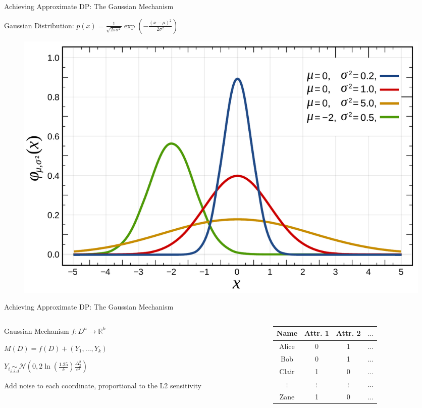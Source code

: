 \documentclass[12pt,aspectratio=169]{beamer}
\begin{document}
\begin{frame}{Achieving Approximate DP: The Gaussian Mechanism}

Gaussian Distribution: $p(x) = \frac{1}{\sqrt{2\pi \sigma^2}}\exp (-\frac{(x - \mu)^2}{2\sigma^2})$

\begin{figure}
    \centering
    \includegraphics[width=0.7\linewidth]{figures/Normal_Distribution_PDF.pdf}
\end{figure}

\end{frame}

\begin{frame}{Achieving Approximate DP: The Gaussian Mechanism}

\begin{columns}[c]

\begin{column}{.5\textwidth}

\begin{block}{Gaussian Mechanism}
$f: D^n \rightarrow \mathbb{R}^k$

$M(D) = f(D) + (Y_1, \dots, Y_k)$

$Y_i \underset{i.i.d}{\sim} \mathcal{N}(0, 2\ln(\frac{1.25}{\delta})\frac{\Delta_2^2}{\varepsilon^2} )$
\end{block}

Add noise to each coordinate, proportional to the L2 sensitivity

\end{column}

\begin{column}{.5\textwidth}

\begin{table}[t]
    \centering
    \begin{tabular}{c|ccc}
    Name    &   Attr. 1 & Attr. 2 & $\dots$\\
    \hline
    Alice     &  0 & 1 & $\dots$\\
    Bob     & 0 & 1 & $\dots$\\
    Clair     & 1 & 0 & $\dots$\\
    $\vdots$    & $\vdots$ & $\vdots$& $\dots$\\
    Zane    &   1 & 0 & $\dots$\\
    \end{tabular}
\end{table}

\end{column}
\end{columns}

\end{frame}
\end{document}
